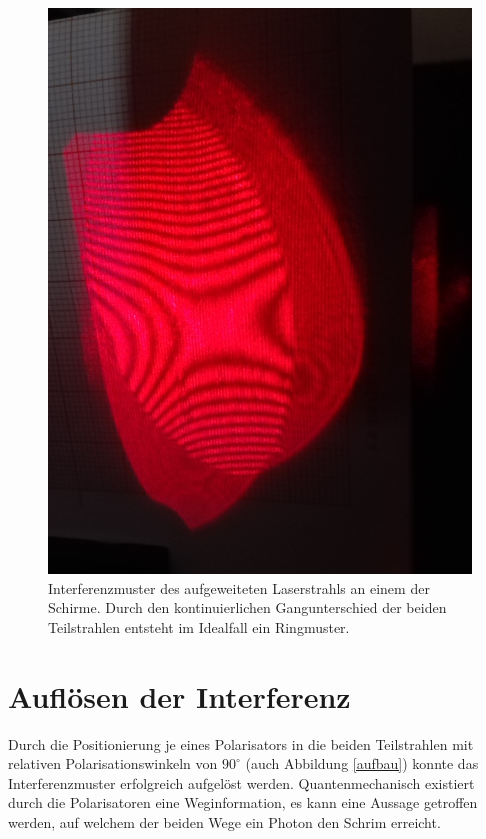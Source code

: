 \documentclass{include/thesisclass3}
\begin{document}
\begin{figure}[H]
\centering
\includegraphics[scale=0.1]{images/interferenz.jpg}
\caption{Interferenzmuster des aufgeweiteten Laserstrahls an einem der Schirme. Durch den kontinuierlichen Gangunterschied der beiden Teilstrahlen entsteht im Idealfall ein Ringmuster.}
\label{interferenz}
\end{figure}
\section{Auflösen der Interferenz}
Durch die Positionierung je eines Polarisators in die beiden Teilstrahlen mit relativen Polarisationswinkeln von $90^\circ$ (auch Abbildung \ref{aufbau}) konnte das Interferenzmuster erfolgreich aufgelöst werden. Quantenmechanisch existiert durch die Polarisatoren eine Weginformation, es kann eine Aussage getroffen werden, auf welchem der beiden Wege ein Photon den Schrim erreicht.
\end{document}
